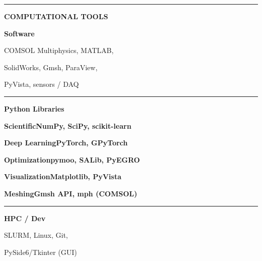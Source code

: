 \documentclass[a4paper,10pt]{article}
\newlength{\sbC}\setlength{\sbC}{54mm}
\newcommand{\sideheading}[1]{%
  \vspace{5pt}%
  {\color{sideborder}\rule{\sbC}{0.3pt}}\par\vspace{2pt}%
  {\color{accentlight}\fontsize{6}{8}\selectfont\bfseries\MakeUppercase{#1}}\par\vspace{4pt}%
}
\begin{document}
{{\begin{minipage}{\sbC}
    \sideheading{Computational Tools}
    {\fontsize{7}{9}\selectfont
      \color{accentlight}\bfseries Software\normalfont\par\vspace{1.5pt}
      \color{sidegray}COMSOL Multiphysics, MATLAB,\par
      \color{sidegray}SolidWorks, Gmsh, ParaView,\par
      \color{sidegray}PyVista, sensors / DAQ\par
    }
    \vspace{4pt}
    {\color{sideborder}\rule{\sbC}{0.3pt}}\par\vspace{3pt}
    {\fontsize{7}{9}\selectfont
      \color{accentlight}\bfseries Python Libraries\normalfont\par\vspace{2pt}
      \color{accentlight}\scriptsize\bfseries Scientific\normalfont\color{sidegray}\fontsize{7}{9}\selectfont\enspace NumPy, SciPy, scikit-learn\par\vspace{1.5pt}
      \color{accentlight}\scriptsize\bfseries Deep Learning\normalfont\color{sidegray}\fontsize{7}{9}\selectfont\enspace PyTorch, GPyTorch\par\vspace{1.5pt}
      \color{accentlight}\scriptsize\bfseries Optimization\normalfont\color{sidegray}\fontsize{7}{9}\selectfont\enspace pymoo, SALib, PyEGRO\par\vspace{1.5pt}
      \color{accentlight}\scriptsize\bfseries Visualization\normalfont\color{sidegray}\fontsize{7}{9}\selectfont\enspace Matplotlib, PyVista\par\vspace{1.5pt}
      \color{accentlight}\scriptsize\bfseries Meshing\normalfont\color{sidegray}\fontsize{7}{9}\selectfont\enspace Gmsh API, mph (COMSOL)\par
    }
    \vspace{4pt}
    {\color{sideborder}\rule{\sbC}{0.3pt}}\par\vspace{3pt}
    {\fontsize{7}{9}\selectfont
      \color{accentlight}\bfseries HPC / Dev\normalfont\par\vspace{1.5pt}
      \color{sidegray}SLURM, Linux, Git,\par
      \color{sidegray}PySide6/Tkinter (GUI)\par\vspace{3pt}
    }
    \end{minipage}
    \vfill
  }%
}%
\end{document}
